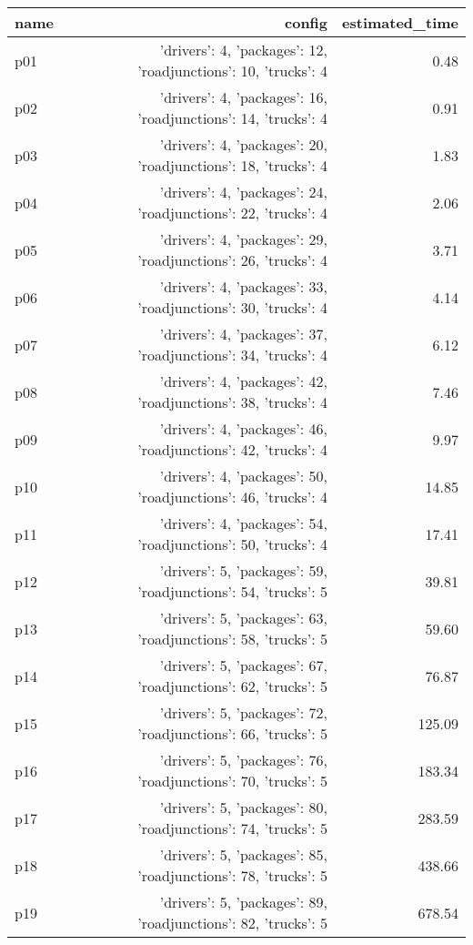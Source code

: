 \documentclass{article}
\begin{document}
                            \begin{center}
                            \scriptsize
                            \begin{tabular}{@{}l|r|r@{}}
                            name & config & estimated\_time\\\midrule
                              p01&{'drivers': 4, 'packages': 12, 'roadjunctions': 10, 'trucks': 4}&0.48\\
  p02&{'drivers': 4, 'packages': 16, 'roadjunctions': 14, 'trucks': 4}&0.91\\
  p03&{'drivers': 4, 'packages': 20, 'roadjunctions': 18, 'trucks': 4}&1.83\\
  p04&{'drivers': 4, 'packages': 24, 'roadjunctions': 22, 'trucks': 4}&2.06\\
  p05&{'drivers': 4, 'packages': 29, 'roadjunctions': 26, 'trucks': 4}&3.71\\
  p06&{'drivers': 4, 'packages': 33, 'roadjunctions': 30, 'trucks': 4}&4.14\\
  p07&{'drivers': 4, 'packages': 37, 'roadjunctions': 34, 'trucks': 4}&6.12\\
  p08&{'drivers': 4, 'packages': 42, 'roadjunctions': 38, 'trucks': 4}&7.46\\
  p09&{'drivers': 4, 'packages': 46, 'roadjunctions': 42, 'trucks': 4}&9.97\\
  p10&{'drivers': 4, 'packages': 50, 'roadjunctions': 46, 'trucks': 4}&14.85\\
  p11&{'drivers': 4, 'packages': 54, 'roadjunctions': 50, 'trucks': 4}&17.41\\
  p12&{'drivers': 5, 'packages': 59, 'roadjunctions': 54, 'trucks': 5}&39.81\\
  p13&{'drivers': 5, 'packages': 63, 'roadjunctions': 58, 'trucks': 5}&59.60\\
  p14&{'drivers': 5, 'packages': 67, 'roadjunctions': 62, 'trucks': 5}&76.87\\
  p15&{'drivers': 5, 'packages': 72, 'roadjunctions': 66, 'trucks': 5}&125.09\\
  p16&{'drivers': 5, 'packages': 76, 'roadjunctions': 70, 'trucks': 5}&183.34\\
  p17&{'drivers': 5, 'packages': 80, 'roadjunctions': 74, 'trucks': 5}&283.59\\
  p18&{'drivers': 5, 'packages': 85, 'roadjunctions': 78, 'trucks': 5}&438.66\\
  p19&{'drivers': 5, 'packages': 89, 'roadjunctions': 82, 'trucks': 5}&678.54\\

\end{tabular}
\end{center}
\end{document}
